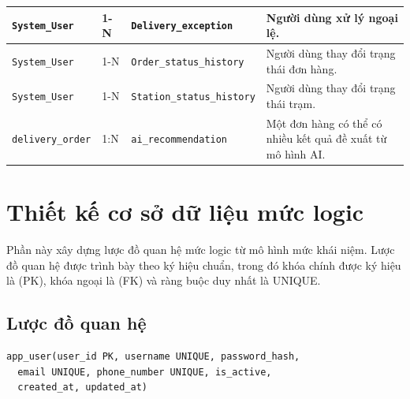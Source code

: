 \begin{longtable}{|p{3.4cm}|p{1cm}|p{5.3cm}|p{6cm}|}
\texttt{System\_User} & 
1-N & 
\texttt{Delivery\_exception} & Người dùng xử lý ngoại lệ. \\ \hline

\texttt{System\_User} & 
1-N & 
\texttt{Order\_status\_history} & Người dùng thay đổi trạng thái đơn hàng. \\ \hline

\texttt{System\_User} & 
1-N & 
\texttt{Station\_status\_history} & Người dùng thay đổi trạng thái trạm. \\ \hline

\texttt{delivery\_order} &
1:N &
\texttt{ai\_recommendation} &
Một đơn hàng có thể có nhiều kết quả đề xuất từ mô hình AI. \\ \hline

\end{longtable}
\renewcommand{\arraystretch}{1}

\section{Thiết kế cơ sở dữ liệu mức logic}\label{s:logical}

Phần này xây dựng lược đồ quan hệ mức logic từ mô hình mức khái niệm. Lược đồ quan hệ được trình bày theo ký hiệu chuẩn, trong đó khóa chính được ký hiệu là (PK), khóa ngoại là (FK) và ràng buộc duy nhất là UNIQUE.

\subsection{Lược đồ quan hệ}

\begin{verbatim}
app_user(user_id PK, username UNIQUE, password_hash,
  email UNIQUE, phone_number UNIQUE, is_active,
  created_at, updated_at)
\end{verbatim}
